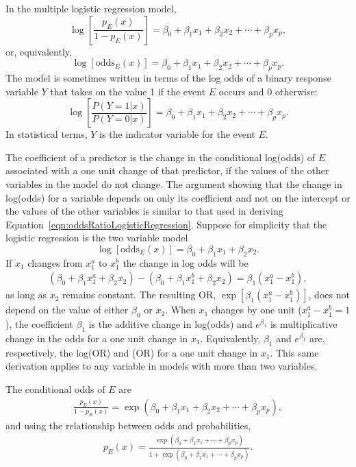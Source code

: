 In the multiple logistic regression model,
\[
 \log\left[\frac{p_E(x)}{1 - p_E(x)}\right] = \beta_0 + \beta_1 x_1 +
      \beta_2 x_2 + \cdots + \beta_p x_p,
\]
or, equivalently,
\[
  \log\left[\text{odds}_E(x)\right] = \beta_0 + \beta_1 x_1 +
      \beta_2 x_2 + \cdots + \beta_p x_p.
\]
The model is sometimes written in terms of the log odds of a binary response variable $Y$ that takes on the value 1 if the event $E$ occurs and 0 otherwise:
\[
  \log\left[\frac{P(Y = 1|x)}{P(Y = 0|x)}\right] = \beta_0 + \beta_1 x_1 +
      \beta_2 x_2 + \cdots + \beta_p x_p.
\]
In statistical terms, $Y$ is the indicator variable for the event $E$.

The coefficient of a predictor is the change in the conditional log(odds) of $E$ associated with a one unit change of that predictor, if the values of the other variables in the model do not change.  The argument showing that the change in log(odds) for a variable depends on only its coefficient and not on the intercept or the values of the other variables is similar to that used in deriving Equation~\ref{eqn:oddsRatioLogisticRegression}.  Suppose for simplicity that the logistic regression is the two variable model
\[
  \log\left[\text{odds}_E(x)\right] = \beta_0 + \beta_1 x_1 +
      \beta_2 x_2.
\]
If $x_1$ changes from $x_1^a$ to $x_1^b$ the change in log odds will be
\begin{align*}
  (\beta_0 + \beta_1 x_1^a + \beta_2 x_2) -  (\beta_0 + \beta_1 x_1^b + \beta_2 x_2)
    = \beta_1(x_1^a - x_1^b),
\end{align*}
as long as $x_2$ remains constant.  The resulting OR, $\exp[\beta_1(x_1^a - x_1^b)]$, does not depend on the value of either $\beta_0$ or $x_2$. When $x_1$ changes by one unit ($x_1^a - x_1^b = 1$), the coefficient $\beta_1$ is the additive change in log(odds) and $e^{\beta_1}$ is multiplicative change in the odds for a one unit change in $x_1$. Equivalently, $\beta_1$ and  $e^{\beta_1}$ are, respectively, the log(OR) and (OR) for a one unit change in $x_1$. This same derivation applies to any variable in models with more than two variables.

The conditional odds of $E$ are
\begin{align}
  \frac{p_E(x)}{1 - p_E(x)} = \exp(\beta_0 + \beta_1 x_1 +
  \beta_2 x_2 + \cdots + \beta_p x_p),
  \label{eqn:oddsMultipleLogistic}
\end{align}
and using the relationship between odds and probabilities,
\begin{align}
  p_E(x) = \frac{\exp(\beta_0 + \beta_1 x_1 + \cdots + \beta_p x_p)}
         {1 + \exp(\beta_0 + \beta_1 x_1 + \cdots + \beta_p x_p)}.
         \label{eqn:probabilityMultipleLogistic}
\end{align}

